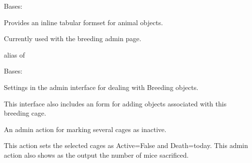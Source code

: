 \documentclass[letterpaper,10pt,english]{sphinxmanual}
\begin{document}
\begin{fulllineitems}
\label{api:mousedb.animal.admin.AnimalInline}
Bases: 

Provides an inline tabular formset for animal objects.

Currently used with the breeding admin page.


\begin{fulllineitems}
\label{api:mousedb.animal.admin.AnimalInline.media}
\end{fulllineitems}



\begin{fulllineitems}
\label{api:mousedb.animal.admin.AnimalInline.model}
alias of 

\end{fulllineitems}


\end{fulllineitems}



\begin{fulllineitems}
\label{api:mousedb.animal.admin.BreedingAdmin}
Bases: 

Settings in the admin interface for dealing with Breeding objects.

This interface also includes an form for adding objects associated with this breeding cage.


\begin{fulllineitems}
\label{api:mousedb.animal.admin.BreedingAdmin.mark_deactivated}
An admin action for marking several cages as inactive.

This action sets the selected cages as Active=False and Death=today.
This admin action also shows as the output the number of mice sacrificed.

\end{fulllineitems}



\begin{fulllineitems}
\label{api:mousedb.animal.admin.BreedingAdmin.media}
\end{fulllineitems}


\end{fulllineitems}
\end{document}
